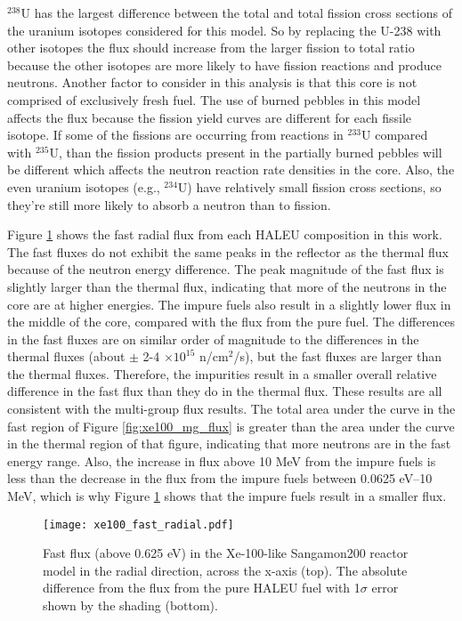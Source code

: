 $^{238}$U has the largest difference between the total and total 
fission cross sections of the uranium isotopes considered for this model. 
So by replacing the U-238 with other isotopes the flux should 
increase from the larger fission to total ratio because the other isotopes 
are more likely to have fission reactions and produce neutrons.
Another factor to consider in this analysis is that this core is not 
comprised of exclusively fresh fuel. 
The use of burned pebbles in this model affects the flux because the 
fission yield curves are different for each fissile isotope. If some 
of the fissions are occurring from reactions in $^{233}$U compared with 
$^{235}$U, than the fission products present in the partially 
burned pebbles will be different which affects the neutron reaction 
rate densities in the core. Also, the even uranium isotopes 
(e.g., $^{234}$U) have relatively small fission cross sections, 
so they're still more likely to absorb a neutron than to fission. 

Figure \ref{fig:xe100_fast_radial} shows the fast radial flux from 
each \gls{HALEU} composition in this work. The fast fluxes do not 
exhibit the same peaks in the reflector as the thermal flux 
because of the neutron energy difference. The peak magnitude of 
the fast flux is slightly 
larger than the thermal flux, indicating that more of the neutrons 
in the core are at higher energies. The impure fuels also result in a 
slightly lower flux in the middle of the core, compared with the  
flux from the pure fuel. The differences in the fast fluxes are on similar 
order of magnitude to the differences in the thermal fluxes (about $\pm$ 
2-4 $\times 10^{15}$ n/cm$^2$/s), but the fast fluxes are larger than 
the thermal fluxes. Therefore, the impurities result in a smaller overall
relative difference in the fast flux than they do in the thermal 
flux. These results are all consistent with the multi-group flux results. 
The total area under the curve in the fast region of Figure 
\ref{fig:xe100_mg_flux} is greater than the area under the curve 
in the thermal region of that figure, indicating that more neutrons 
are in the fast energy range. Also, the increase in flux above 
10 MeV from the impure fuels is less than the decrease in the flux 
from the impure fuels between 0.0625 eV--10 MeV, which is why 
Figure \ref{fig:xe100_fast_radial} shows that the impure 
fuels result in a smaller flux. 

\begin{figure}[ht]
        \centering 
        \texttt{[image: xe100\_fast\_radial.pdf]}
        \caption{Fast flux (above 0.625 eV) in the Xe-100-like Sangamon200 
        reactor model in the radial direction, across the 
        x-axis (top). The absolute difference from the flux from 
        the pure \gls{HALEU} fuel with 1$\sigma$ error shown by 
        the shading (bottom).}
        \label{fig:xe100_fast_radial}
\end{figure}


